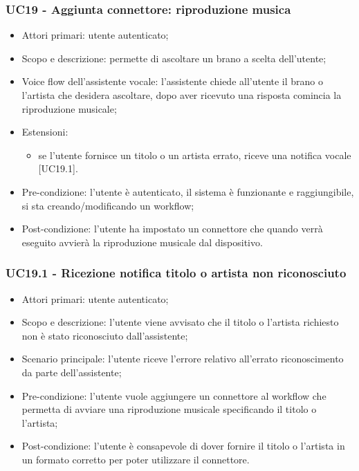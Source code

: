 \subsubsection{UC19 - Aggiunta connettore: riproduzione musica}
\begin{itemize}
	\item  Attori primari: utente autenticato;
	\item  Scopo e descrizione: permette di ascoltare un brano a scelta dell'utente;
	\item  Voice flow dell'assistente vocale: l'assistente chiede all'utente il brano o l'artista che desidera ascoltare, dopo aver ricevuto una risposta comincia la riproduzione musicale;
	\item  Estensioni:
		   \begin{itemize}
				\item se l'utente fornisce un titolo o un artista errato, riceve una notifica vocale [UC19.1].
		   \end{itemize}
	\item  Pre-condizione: l'utente è autenticato, il sistema è funzionante e raggiungibile, si sta creando/modificando un workflow;
	\item  Post-condizione: l'utente ha impostato un connettore che quando verrà eseguito avvierà la riproduzione musicale dal dispositivo.
\end{itemize}
\subsubsection{UC19.1 - Ricezione notifica titolo o artista non riconosciuto}
\begin{itemize}
	\item  Attori primari: utente autenticato;
	\item  Scopo e descrizione: l'utente viene avvisato che il titolo o l'artista richiesto non è stato riconosciuto dall'assistente;
	\item  Scenario principale: l'utente riceve l'errore relativo all'errato riconoscimento da parte dell'assistente;
	\item  Pre-condizione: l'utente vuole aggiungere un connettore al workflow che permetta di avviare una riproduzione musicale specificando il titolo o l'artista;
	\item  Post-condizione: l'utente è consapevole di dover fornire il titolo o l'artista in un formato corretto per poter utilizzare il connettore.
\end{itemize}
